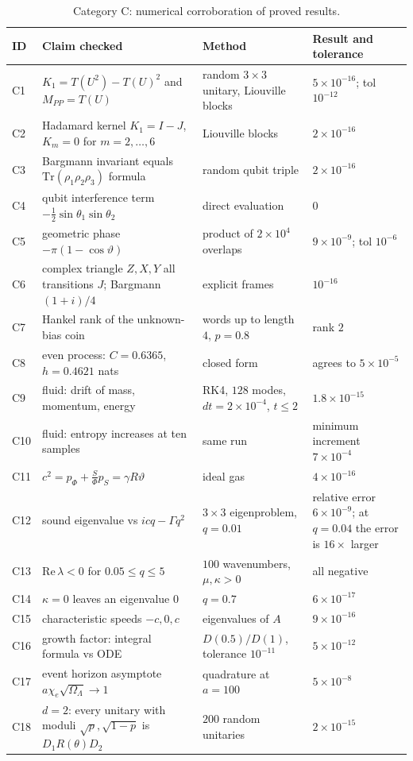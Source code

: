 \documentclass[11pt,oneside]{book}
\theoremstyle{definition}
\theoremstyle{remark}
\begin{document}
\begin{table}[h]
\centering
\scriptsize
\begin{tabular}{p{0.8cm}p{5.2cm}p{3.2cm}p{3.3cm}}
\hline
ID & Claim checked & Method & Result and tolerance \\
\hline
C1 & $K_1=T(U^2)-T(U)^2$ and $M_{PP}=T(U)$ & random $3\times3$ unitary, Liouville blocks & $5\times10^{-16}$; tol $10^{-12}$ \\
C2 & Hadamard kernel $K_1=I-J$, $K_m=0$ for $m=2,\dots,6$ & Liouville blocks & $2\times10^{-16}$ \\
C3 & Bargmann invariant equals $\mathrm{Tr}(\rho_1\rho_2\rho_3)$ formula & random qubit triple & $2\times10^{-16}$ \\
C4 & qubit interference term $-\tfrac12\sin\theta_1\sin\theta_2$ & direct evaluation & $0$ \\
C5 & geometric phase $-\pi(1-\cos\vartheta)$ & product of $2\times10^4$ overlaps & $9\times10^{-9}$; tol $10^{-6}$ \\
C6 & complex triangle $Z,X,Y$ all transitions $J$; Bargmann $(1+i)/4$ & explicit frames & $10^{-16}$ \\
C7 & Hankel rank of the unknown-bias coin & words up to length $4$, $p=0.8$ & rank $2$ \\
C8 & even process: $C=0.6365$, $h=0.4621$ nats & closed form & agrees to $5\times10^{-5}$ \\
C9 & fluid: drift of mass, momentum, energy & RK4, $128$ modes, $dt=2\times10^{-4}$, $t\le2$ & $1.8\times10^{-15}$ \\
C10 & fluid: entropy increases at ten samples & same run & minimum increment $7\times10^{-4}$ \\
C11 & $c^2=p_\Phi+\tfrac S\Phi p_S=\gamma R\vartheta$ & ideal gas & $4\times10^{-16}$ \\
C12 & sound eigenvalue vs $icq-\Gamma q^2$ & $3\times3$ eigenproblem, $q=0.01$ & relative error $6\times10^{-9}$; at $q=0.04$ the error is $16\times$ larger \\
C13 & $\mathrm{Re}\,\lambda<0$ for $0.05\le q\le5$ & $100$ wavenumbers, $\mu,\kappa>0$ & all negative \\
C14 & $\kappa=0$ leaves an eigenvalue $0$ & $q=0.7$ & $6\times10^{-17}$ \\
C15 & characteristic speeds $-c,0,c$ & eigenvalues of $A$ & $9\times10^{-16}$ \\
C16 & growth factor: integral formula vs ODE & $D(0.5)/D(1)$, tolerance $10^{-11}$ & $5\times10^{-12}$ \\
C17 & event horizon asymptote $a\chi_e\sqrt{\Omega_\Lambda}\to1$ & quadrature at $a=100$ & $5\times10^{-8}$ \\
C18 & $d=2$: every unitary with moduli $\sqrt p,\sqrt{1-p}$ is $D_1R(\theta)D_2$ & $200$ random unitaries & $2\times10^{-15}$ \\
\hline
\end{tabular}
\caption{Category C: numerical corroboration of proved results.}
\end{table}
\end{document}
